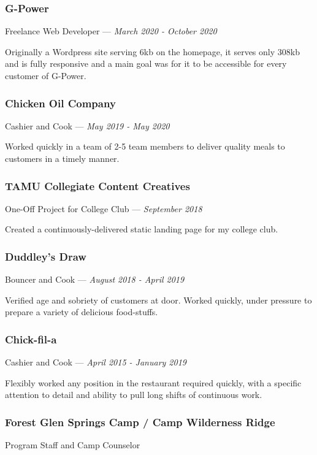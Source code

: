\documentclass[letterpaper,10pt]{article}
\begin{document}
    \subsubsection{G-Power}
    \hfill Freelance Web Developer --- \emph{March 2020 - October 2020}

    Originally a Wordpress site serving 6kb on the homepage, it serves only 308kb and is fully responsive and a main goal was for it to be accessible for every customer of G-Power.

    \subsubsection{Chicken Oil Company}
    \hfill Cashier and Cook --- \emph{May 2019 - May 2020}

    Worked quickly in a team of 2-5 team members to deliver quality meals to customers in a timely manner.

    \subsubsection{TAMU Collegiate Content Creatives}
    \hfill One-Off Project for College Club --- \emph{September 2018}

    Created a continuously-delivered static landing page for my college club.

    \subsubsection{Duddley's Draw}
    \hfill Bouncer and Cook --- \emph{August 2018 - April 2019}

    Verified age and sobriety of customers at door. Worked quickly, under pressure to prepare a variety of delicious food-stuffs.


    \subsubsection{Chick-fil-a}
    \hfill Cashier and Cook --- \emph{April 2015 - January 2019}

    Flexibly worked any position in the restaurant required quickly, with a specific attention to detail and ability to pull long shifts of continuous work.

    \subsubsection{Forest Glen Springs Camp / Camp Wilderness Ridge}
    \hfill Program Staff and Camp Counselor 
    
\end{document}
